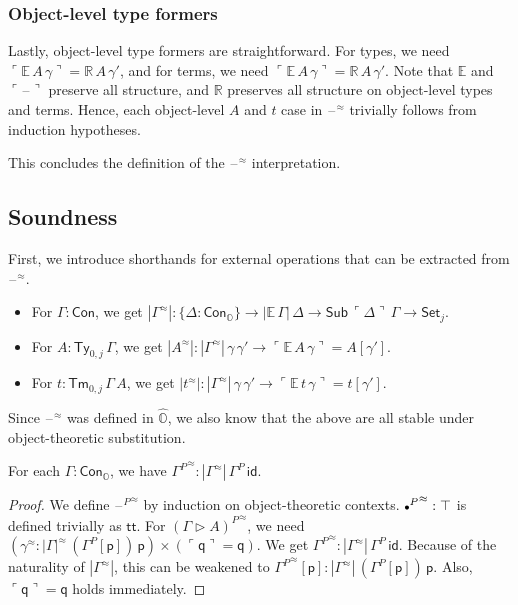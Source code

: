 \documentclass[acmsmall]{acmart}
\newcommand{\msf}[1]{\mathsf{#1}}
\newcommand{\mbb}[1]{\mathbb{#1}}
\newcommand{\ext}{\triangleright}
\newcommand{\mbbo}{\mbb{O}}
\newcommand{\Con}{\msf{Con}}
\newcommand{\Sub}{\msf{Sub}}
\newcommand{\Ty}{\msf{Ty}}
\newcommand{\Tm}{\msf{Tm}}
\newcommand{\Cono}{\msf{Con}_{\mbbo}}
\newcommand{\p}{\mathsf{p}}
\newcommand{\q}{\mathsf{q}}
\renewcommand{\tt}{\msf{tt}}
\newcommand{\emptycon}{\scaleobj{.75}\bullet}
\newcommand{\id}{\msf{id}}
\newcommand{\Set}{\mathsf{Set}}
\newcommand{\blank}{{\mathord{\hspace{1pt}\text{--}\hspace{1pt}}}}
\newcommand{\emb}[1]{\ulcorner#1\urcorner}
\newcommand{\hato}{\bm\hat{\mbbo}}
\newcommand{\ev}{\mbb{E}}
\newcommand{\re}{\mbb{R}}
\theoremstyle{remark}
\newcommand{\rel}{^{\approx}}
\begin{document}
\subsubsection{Object-level type formers}
Lastly, object-level type formers are straightforward. For types, we need
$\emb{\ev\,A\,\gamma} = \re\,A\,\gamma'$, and for terms, we need
$\emb{\ev\,A\,\gamma} = \re\,A\,\gamma'$. Note that $\ev$ and $\emb{\blank}$
preserve all structure, and $\re$ preserves all structure on object-level types
and terms. Hence, each object-level $A$ and $t$ case in $\blank\rel$ trivially
follows from induction hypotheses.

This concludes the definition of the $\blank\rel$ interpretation.

\subsection{Soundness}

\begin{definition} First, we introduce shorthands for
external operations that can be extracted from $\blank\rel$.
\begin{itemize}
  \item For $\Gamma : \Con$, we get $|\Gamma\rel| : \{\Delta : \Cono\} \to |\ev\,\Gamma|\,\Delta \to
    \Sub\,\emb{\Delta}\,\Gamma \to \Set_j$.
  \item For $A : \Ty_{0,j}\,\Gamma$, we get $|A\rel| : |\Gamma\rel|\,\gamma\,\gamma' \to \emb{\ev\,A\,\gamma} = A[\gamma']$.
  \item For $t : \Tm_{0,j}\,\Gamma\,A$, we get $|t\rel| : |\Gamma\rel|\,\gamma\,\gamma' \to \emb{\ev\,t\,\gamma} = t[\gamma']$.
\end{itemize}
Since $\blank\rel$ was defined in $\hato$, we also know that the above are all
stable under object-theoretic substitution.
\end{definition}

\begin{theorem}
For each $\Gamma : \Cono$, we have ${\Gamma^P}\rel : |\Gamma\rel|\,\Gamma^P\,\id$.
\end{theorem}
\begin{proof}
We define ${\blank^P}\rel$ by induction on object-theoretic contexts.
${\emptycon^P}\rel : \top$ is defined trivially as $\tt$. For ${(\Gamma \ext
  A)^P}\rel$, we need $(\gamma\rel : |\Gamma|\rel\,(\Gamma^P[\p])\,\p) \times
(\emb{\q} = \q)$. We get ${\Gamma^P}\rel : |\Gamma\rel|\,\Gamma^P\,\id$. Because
of the naturality of $|\Gamma\rel|$, this can be weakened to ${\Gamma^P}\rel[\p]
: |\Gamma\rel|\,(\Gamma^P[\p])\,\p$. Also, $\emb{\q} = \q$ holds immediately.
\end{proof}
\end{document}
